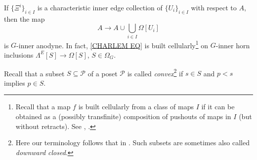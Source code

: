 \documentclass[a4paper,10pt
 ,draft
]{article}%
\begin{document}
\begin{lemma}\label{CHAREDGE LEM}
If $\{\Xi^i\}_{i \in I}$ is a characteristic inner edge collection of $\{U_i\}_{i\in I}$ with respect to $A$, then the map
	\begin{equation}\label{CHARLEM EQ}
		A \to A \cup \bigcup_{i \in I} \Omega[U_i]
	\end{equation}
is $G$-inner anodyne. 
In fact, \eqref{CHARLEM EQ} is built cellularly\footnote{Recall that a map $f$ is built cellularly from a class of maps $I$ if it can be obtained as a (possibly transfinite) composition of pushouts of maps in $I$ (but without retracts). See \cite[Def. 2.1.9]{Hov99},
\cite[Example 12.6.12]{Ri14}.
%
}
on $G$-inner horn inclusions $\Lambda^E[S] \to \Omega[S]$, $S \in \Omega_G$.
\end{lemma}

Recall that a subset $S \subseteq \mathcal{P}$ of a poset $\mathcal{P}$ is called \textit{convex}\footnote{Here our terminology follows that in \cite[\S 0]{Go91}. Such subsets are sometimes also called \textit{downward closed}.} if $s \in S$ and 
$p<s$ implies $p \in S$.
\end{document}
